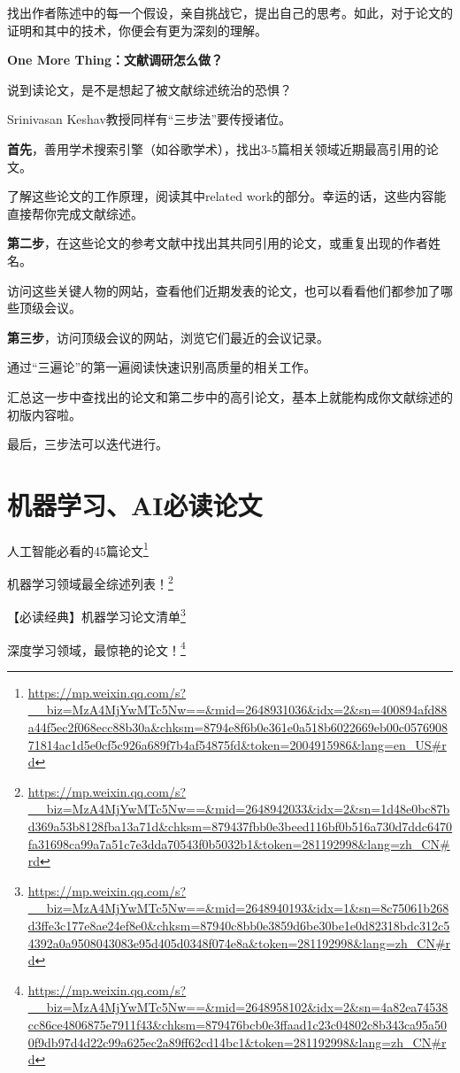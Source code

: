 \documentclass[]{ctexbook}
\renewcommand{\href}[2]{#2\footnote{\url{#1}}}
\begin{document}
找出作者陈述中的每一个假设，亲自挑战它，提出自己的思考。如此，对于论文的证明和其中的技术，你便会有更为深刻的理解。

\textbf{One More Thing：文献调研怎么做？}

说到读论文，是不是想起了被文献综述统治的恐惧？

Srinivasan Keshav教授同样有``三步法''要传授诸位。

\textbf{首先}，善用学术搜索引擎（如谷歌学术），找出3-5篇相关领域近期最高引用的论文。

了解这些论文的工作原理，阅读其中related work的部分。幸运的话，这些内容能直接帮你完成文献综述。

\textbf{第二步}，在这些论文的参考文献中找出其共同引用的论文，或重复出现的作者姓名。

访问这些关键人物的网站，查看他们近期发表的论文，也可以看看他们都参加了哪些顶级会议。

\textbf{第三步}，访问顶级会议的网站，浏览它们最近的会议记录。

通过``三遍论''的第一遍阅读快速识别高质量的相关工作。

汇总这一步中查找出的论文和第二步中的高引论文，基本上就能构成你文献综述的初版内容啦。

最后，三步法可以迭代进行。

\hypertarget{ux673aux5668ux5b66ux4e60aiux5fc5ux8bfbux8bbaux6587}{%
\section{机器学习、AI必读论文}\label{ux673aux5668ux5b66ux4e60aiux5fc5ux8bfbux8bbaux6587}}

\href{https://mp.weixin.qq.com/s?__biz=MzA4MjYwMTc5Nw==\&mid=2648931036\&idx=2\&sn=400894afd88a44f5ec2f068ecc88b30a\&chksm=8794e8f6b0e361e0a518b6022669eb00c057690871814ac1d5e0cf5c926a689f7b4af54875fd\&token=2004915986\&lang=en_US\#rd}{人工智能必看的45篇论文}

\href{https://mp.weixin.qq.com/s?__biz=MzA4MjYwMTc5Nw==\&mid=2648942033\&idx=2\&sn=1d48e0bc87bd369a53b8128fba13a71d\&chksm=879437fbb0e3beed116bf0b516a730d7ddc6470fa31698ca99a7a51c7e3dda70543f0b5032b1\&token=281192998\&lang=zh_CN\#rd}{机器学习领域最全综述列表！}

\href{https://mp.weixin.qq.com/s?__biz=MzA4MjYwMTc5Nw==\&mid=2648940193\&idx=1\&sn=8c75061b268d3ffe3c177e8ae24ef8e0\&chksm=87940c8bb0e3859d6be30be1e0d82318bdc312c54392a0a9508043083e95d405d0348f074e8a\&token=281192998\&lang=zh_CN\#rd}{【必读经典】机器学习论文清单}

\href{https://mp.weixin.qq.com/s?__biz=MzA4MjYwMTc5Nw==\&mid=2648958102\&idx=2\&sn=4a82ea74538cc86ce4806875e7911f43\&chksm=879476bcb0e3ffaad1c23c04802c8b343ca95a500f9db97d4d22c99a625ec2a89ff62cd14bc1\&token=281192998\&lang=zh_CN\#rd}{深度学习领域，最惊艳的论文！}
\end{document}
